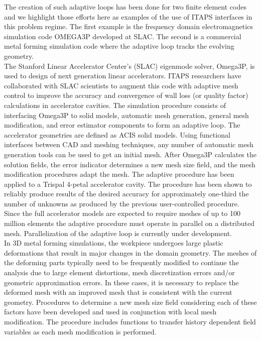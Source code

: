 \documentclass{article}
\begin{document}
The creation of such adaptive loops has been done for two finite 
element codes and we highlight those efforts here as examples 
of the use of ITAPS interfaces in this problem regime. The first example is 
the frequency domain electromagnetics simulation code OMEGA3P 
developed at SLAC. The second is a commercial metal forming simulation 
code where the adaptive loop tracks the evolving geometry. \\


The Stanford Linear Accelerator Center's (SLAC) eigenmode solver, 
Omega3P, is used to design of next generation linear accelerators. 
ITAPS researchers have collaborated with SLAC scientists to augment 
this code with adaptive mesh control to improve the accuracy 
and convergence of wall loss (or quality factor) calculations 
in accelerator cavities. The simulation procedure consists of 
interfacing Omega3P to solid models, automatic mesh generation,
general mesh modification, and error estimator components to 
form an adaptive loop. The accelerator geometries are defined 
as ACIS solid models. Using functional interfaces between CAD 
and meshing techniques, any number of automatic mesh generation 
tools can be used to get an initial mesh. After Omega3P calculates 
the solution fields, the error indicator determines a new mesh 
size field, and the mesh modification procedures adapt the mesh. 
The adaptive procedure has been applied to a Trispal 4-petal 
accelerator cavity. The procedure has been shown to reliably 
produce results of the desired accuracy for approximately one-third 
the number of unknowns as produced by the previous user-controlled
 procedure.\\

 Since the full accelerator models are expected to require meshes 
of up to 100 million elements the adaptive procedure must operate 
in parallel on a distributed mesh. Parallelization of the adaptive 
loop is currently under development.\\


In 3D metal forming simulations, the workpiece undergoes large 
plastic deformations that result in major changes in the domain 
geometry. The meshes of the deforming parts typically need to 
be frequently modified to continue the analysis due to large 
element distortions, mesh discretization errors and/or geometric 
approximation errors. In these cases, it is necessary to replace 
the deformed mesh with an improved mesh that is consistent with 
the current geometry. Procedures to determine a new mesh size 
field considering each of these factors have been developed and 
used in conjunction with local mesh modification. The procedure 
includes functions to transfer history dependent field variables 
as each mesh modification is performed.
\end{document}
